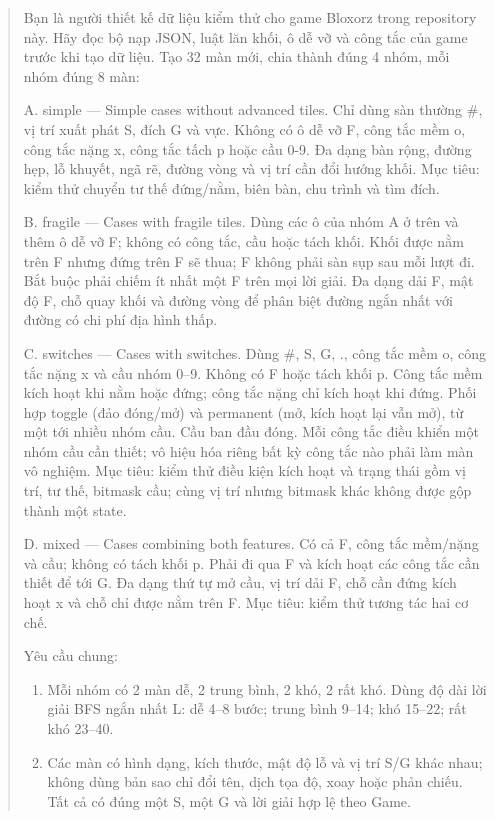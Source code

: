 \begin{quote}
\small
\setlength{\emergencystretch}{2em}
Bạn là người thiết kế dữ liệu kiểm thử cho game Bloxorz trong repository này. Hãy đọc bộ nạp JSON, luật lăn khối, ô dễ vỡ và công tắc của game trước khi tạo dữ liệu. Tạo 32 màn mới, chia thành đúng 4 nhóm, mỗi nhóm đúng 8 màn:
 
\noindent A. simple --- Simple cases without advanced tiles. Chỉ dùng sàn thường \#, vị trí xuất phát S, đích G và vực. Không có ô dễ vỡ F, công tắc mềm o, công tắc nặng x, công tắc tấch p hoặc cầu 0-9. Đa dạng bàn rộng, đường hẹp, lỗ khuyết, ngã rẽ, đường vòng và vị trí cần đổi hướng khối. Mục tiêu: kiểm thử chuyển tư thế đứng/nằm, biên bàn, chu trình và tìm đích.
 
\noindent B. fragile --- Cases with fragile tiles. Dùng các ô của nhóm A ở trên và thêm ô dễ vỡ F; không có công tắc, cầu hoặc tách khối. Khối được nằm trên F nhưng đứng trên F sẽ thua; F không phải sàn sụp sau mỗi lượt đi. Bắt buộc phải chiếm ít nhất một F trên mọi lời giải. Đa dạng dải F, mật độ F, chỗ quay khối và đường vòng để phân biệt đường ngắn nhất với đường có chi phí địa hình thấp.
 
\noindent C. switches --- Cases with switches. Dùng \#, S, G, ., công tắc mềm o, công tắc nặng x và cầu nhóm 0--9. Không có F hoặc tách khối p. Công tắc mềm kích hoạt khi nằm hoặc đứng; công tắc nặng chỉ kích hoạt khi đứng. Phối hợp toggle (đảo đóng/mở) và permanent (mở, kích hoạt lại vẫn mở), từ một tới nhiều nhóm cầu. Cầu ban đầu đóng. Mỗi công tắc điều khiển một nhóm cầu cần thiết; vô hiệu hóa riêng bất kỳ công tắc nào phải làm màn vô nghiệm. Mục tiêu: kiểm thử điều kiện kích hoạt và trạng thái gồm vị trí, tư thế, bitmask cầu; cùng vị trí nhưng bitmask khác không được gộp thành một state.
 
\noindent D. mixed --- Cases combining both features. Có cả F, công tắc mềm/nặng và cầu; không có tách khối p. Phải đi qua F và kích hoạt các công tắc cần thiết để tới G. Đa dạng thứ tự mở cầu, vị trí dải F, chỗ cần đứng kích hoạt x và chỗ chỉ được nằm trên F. Mục tiêu: kiểm thử tương tác hai cơ chế.
 
\noindent Yêu cầu chung:
\begin{enumerate}
  \item Mỗi nhóm có 2 màn dễ, 2 trung bình, 2 khó, 2 rất khó. Dùng độ dài lời giải BFS ngắn nhất L: dễ 4--8 bước; trung bình 9--14; khó 15--22; rất khó 23--40.
 
  \item Các màn có hình dạng, kích thước, mật độ lỗ và vị trí S/G khác nhau; không dùng bản sao chỉ đổi tên, dịch tọa độ, xoay hoặc phản chiếu. Tất cả có đúng một S, một G và lời giải hợp lệ theo Game.
 

\end{enumerate}
\end{quote}
